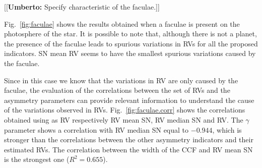 \documentclass[11pt, oneside]{article}
\newcommand{\umberto}[1]{{\color{green}[[\textbf{Umberto: }#1]]}}
\begin{document}
{\umberto{Specify characteristic of the faculae.}

Fig.~\ref{fig:faculae} shows the results obtained when a faculae is present on the photosphere of the star. It is possible to note that, although there is not a planet, the presence of the faculae leads to spurious variations in RVs for all the proposed indicators. SN mean RV seems to have the smallest spurious variations caused by the faculae. %

Since in this case we know that the variations in RV are only caused by the faculae, the evaluation of the correlations between the set of RVs and the asymmetry parameters can provide relevant information to understand the cause of the variations observed in RVs. Fig.~\ref{fig:faculae.corr} shows the correlations obtained using as RV respectively RV mean SN, RV median SN and RV. The $\gamma$ parameter shows a correlation with RV median SN equal to $-0.944$, which is stronger than the correlations between the other asymmetry indicators and their estimated RVs. The correlation between the width of the CCF and RV mean SN is the strongest one ($R^{2}=0.655$).

}
\end{document}
